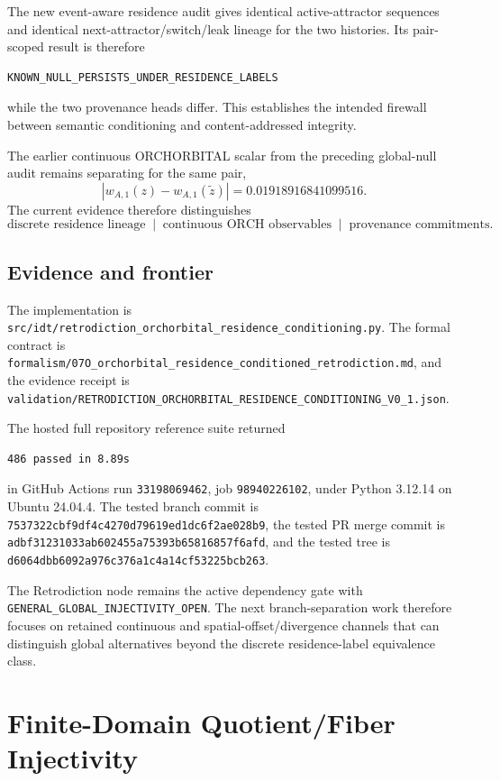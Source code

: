\documentclass[11pt]{book}
\begin{document}
The new event-aware residence audit gives identical active-attractor sequences and identical next-attractor/switch/leak lineage for the two histories. Its pair-scoped result is therefore
\begin{verbatim}
KNOWN_NULL_PERSISTS_UNDER_RESIDENCE_LABELS
\end{verbatim}
while the two provenance heads differ. This establishes the intended firewall between semantic conditioning and content-addressed integrity.

The earlier continuous ORCHORBITAL scalar from the preceding global-null audit remains separating for the same pair,
\[
\boxed{
|w_{A,1}(z)-w_{A,1}(\widetilde z)|
=0.01918916841099516.
}
\]
The current evidence therefore distinguishes
\[
\boxed{
\text{discrete residence lineage}
\;\mid\;
\text{continuous ORCH observables}
\;\mid\;
\text{provenance commitments}.
}
\]

\section{Evidence and frontier}

The implementation is \texttt{src/idt/retrodiction\_orchorbital\_residence\_conditioning.py}. The formal contract is \texttt{formalism/07O\_orchorbital\_residence\_conditioned\_retrodiction.md}, and the evidence receipt is \texttt{validation/RETRODICTION\_ORCHORBITAL\_RESIDENCE\_CONDITIONING\_V0\_1.json}.

The hosted full repository reference suite returned
\begin{verbatim}
486 passed in 8.89s
\end{verbatim}
in GitHub Actions run \texttt{33198069462}, job \texttt{98940226102}, under Python 3.12.14 on Ubuntu 24.04.4. The tested branch commit is \texttt{7537322cbf9df4c4270d79619ed1dc6f2ae028b9}, the tested PR merge commit is \texttt{adbf31231033ab602455a75393b65816857f6afd}, and the tested tree is \texttt{d6064dbb6092a976c376a1c4a14cf53225bcb263}.

The Retrodiction node remains the active dependency gate with \texttt{GENERAL\_GLOBAL\_INJECTIVITY\_OPEN}. The next branch-separation work therefore focuses on retained continuous and spatial-offset/divergence channels that can distinguish global alternatives beyond the discrete residence-label equivalence class.

\chapter{Finite-Domain Quotient/Fiber Injectivity}
\label{chap:quotient-fiber-finite-injectivity}
\end{document}
